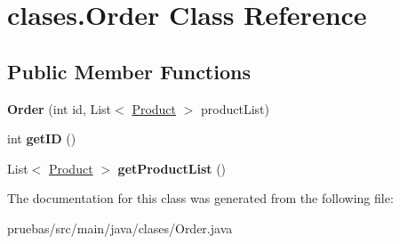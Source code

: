 \hypertarget{classclases_1_1_order}{}\section{clases.\+Order Class Reference}
\label{classclases_1_1_order}
\subsection*{Public Member Functions}
\begin{DoxyCompactItemize}
\item 
\mbox{\label{classclases_1_1_order_a5bf587036274a4563c208b61600614a9}} 
{\bfseries Order} (int id, List$<$ \mbox{\hyperlink{classclases_1_1_product}{Product}} $>$ product\+List)
\item 
\mbox{\label{classclases_1_1_order_a2e1d02601f162e07392865f4a3c1fca0}} 
int {\bfseries get\+ID} ()
\item 
\mbox{\label{classclases_1_1_order_aa9c192ec7bdf6b49ac0ab309f1581d97}} 
List$<$ \mbox{\hyperlink{classclases_1_1_product}{Product}} $>$ {\bfseries get\+Product\+List} ()
\end{DoxyCompactItemize}


The documentation for this class was generated from the following file\+:\begin{DoxyCompactItemize}
\item 
pruebas/src/main/java/clases/Order.\+java\end{DoxyCompactItemize}
